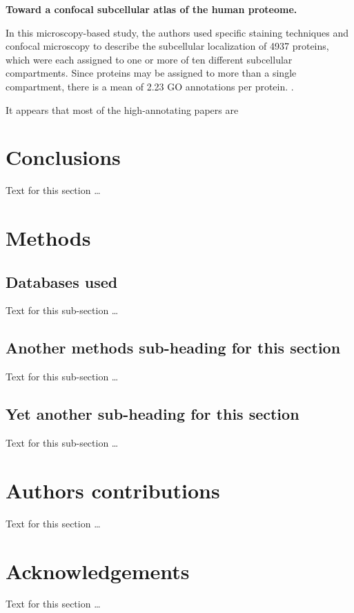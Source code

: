 \documentclass[10pt]{bmc_article}
\newenvironment{bmcformat}{\begin{raggedright}\baselineskip20pt\sloppy\setboolean{publ}{false}}{\end{raggedright}\baselineskip20pt\sloppy}
\begin{document}
\begin{bmcformat}
\textbf{Toward a confocal subcellular atlas of the human proteome.}

In this microscopy-based study, the authors used specific staining techniques and
confocal microscopy to describe the subcellular localization of 4937 proteins, which
were each assigned to one or more of ten different subcellular compartments. Since
proteins may be assigned to more than a single compartment, there is a mean of 2.23
GO annotations per protein. 
\cite{PMID:11121744}. 


It appears that most of the high-annotating papers are 



\section*{Conclusions}
  Text for this section \ldots


  
\section*{Methods}
  \subsection*{Databases used}
    Text for this sub-section \ldots

  \subsection*{Another methods sub-heading for this section}
    Text for this sub-section \ldots

  \subsection*{Yet another sub-heading for this section}
    Text for this sub-section \ldots


    
\section*{Authors contributions}
    Text for this section \ldots

    

\section*{Acknowledgements}
  Text for this section \ldots



\end{bmcformat}
\end{document}
